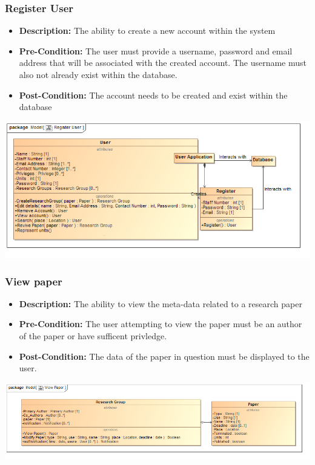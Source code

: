 \documentclass[11pt]{article}
\begin{document}
		 \subsubsection{Register User}
		\begin{itemize}
			\item \textbf{Description: }The ability to create a new account within the system
			\item \textbf{Pre-Condition: }The user must provide a username, password and email address that will be associated with the created account. The username must also not already exist within the database. 
			\item \textbf{Post-Condition: }The account needs to be created and exist within the database
		\end{itemize}
		\begin{center}
			\includegraphics[width=\textwidth]{../Diagrams/DomainModel/RegisterUser.png}\\[0.5cm]
		\end{center}
		\newpage
		\subsubsection{View paper}
		\begin{itemize}
			\item \textbf{Description: }The ability to view the meta-data related to a research paper
			\item \textbf{Pre-Condition: }The user attempting to view the paper must be an author of the paper or have sufficent privledge.
			\item \textbf{Post-Condition: }The data of the paper in question must be displayed to the user.
		\end{itemize}
		\begin{center}
			\includegraphics[width=\textwidth]{../Diagrams/DomainModel/ViewPaper.png}\\[0.5cm]
		\end{center}
		\newpage
\end{document}
